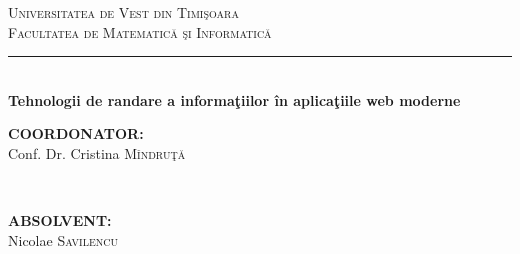 \documentclass[12pt, a4paper]{report}
\begin{document}
\begin{titlepage}

	\newcommand{\HRule}{\rule{\linewidth}{0.5mm}} %

	\center %



	\textsc{\LARGE Universitatea de Vest din Timi\c soara}\\[0.5cm] %
	\textsc{\Large Facultatea de Matematic\u a \c si Informatic\u a}\\[0.5cm] %



	\HRule \\[0.5cm]
	{\Huge \bf Tehnologii de randare a informa\c tiilor \^ in aplica\c tiile web moderne}\\[6cm] %



	\begin{minipage}{0.4\textwidth}
		\begin{flushleft} \large
			\textbf{COORDONATOR:}\\
			Conf. Dr. Cristina \textsc{M\^ indru\c t\u a} %
		\end{flushleft}
	\end{minipage}
	~
	\begin{minipage}{0.4\textwidth}
		\begin{flushright} \large
			\textbf{ABSOLVENT:} \\
			Nicolae \textsc{Savilencu} %
		\end{flushright}
	\end{minipage}\\[1cm]


\end{titlepage}
\end{document}
